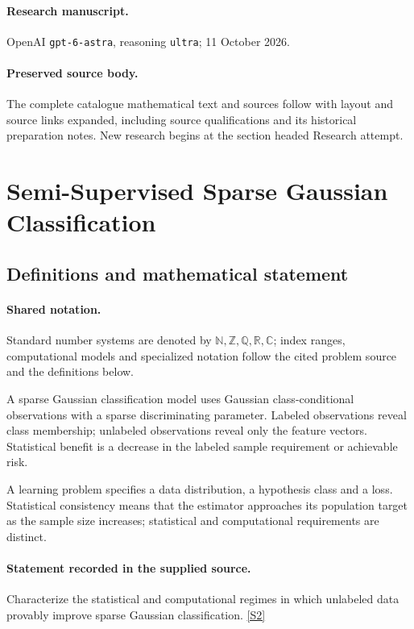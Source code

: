 \documentclass[11pt]{article}
\begin{document}
\paragraph{Research manuscript.} OpenAI \texttt{gpt-6-astra}, reasoning \texttt{ultra}; 11 October 2026.
\paragraph{Preserved source body.} The complete catalogue mathematical text and sources follow with layout and source links expanded, including source qualifications and its historical preparation notes. New research begins at the section headed Research attempt.

\section{Semi-Supervised Sparse Gaussian Classification}\label{statement}

\subsection{Definitions and mathematical statement}

\paragraph{Shared notation.}Standard number systems are denoted by $\mathbb N,\mathbb Z,\mathbb Q,\mathbb R,\mathbb C$; index ranges, computational models and specialized notation follow the cited problem source and the definitions below.


A sparse Gaussian classification model uses Gaussian class-conditional observations with a sparse discriminating parameter. Labeled observations reveal class membership; unlabeled observations reveal only the feature vectors. Statistical benefit is a decrease in the labeled sample requirement or achievable risk.

A learning problem specifies a data distribution, a hypothesis class and a loss. Statistical consistency means that the estimator approaches its population target as the sample size increases; statistical and computational requirements are distinct.
\paragraph{Statement recorded in the supplied source.}
Characterize the statistical and computational regimes in which unlabeled data provably improve sparse Gaussian classification. \href{https://doi.org/10.4171/owr/2024/30}{[S2]}
\end{document}
